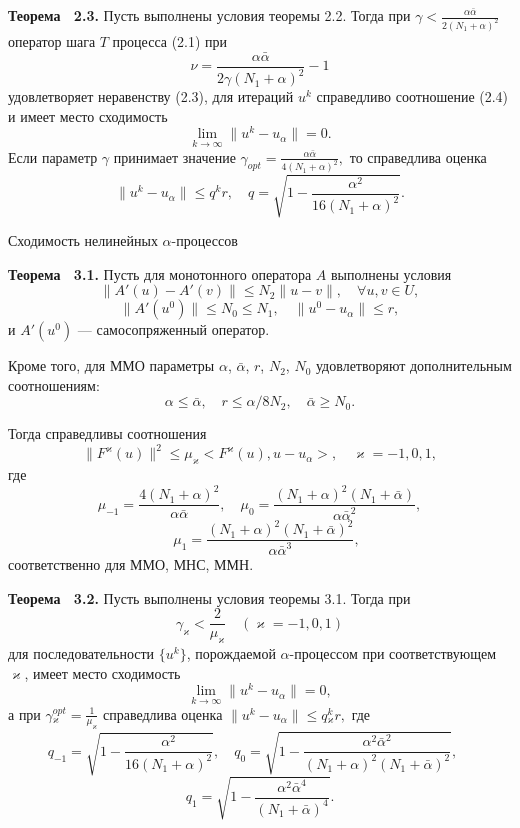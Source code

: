 \documentclass[10pt,pdf, mathserif, hyperref={unicode}]{beamer}
\begin{document}
\begin{frame}
	\begin{block}{\bf Теорема ~2.3.}
		Пусть выполнены условия теоремы 2.2. Тогда при
		$\gamma<\frac{\alpha\bar\alpha}{2(N_1+\alpha)^2}$
		оператор шага $T$ процесса (2.1) при
		$$\nu=\frac{\alpha\bar\alpha}{2\gamma(N_1+\alpha)^2}-1$$
		удовлетворяет неравенству (2.3), для итераций $u^k$ справедливо соотношение (2.4) и имеет место сходимость
		$$\lim_{k\to\infty}\|u^k-u_\alpha\|=0.$$
		Если параметр $\gamma$ принимает значение ${\gamma}_{opt}=\frac{\alpha\bar\alpha}{4(N_1+\alpha)^2},$ то справедлива оценка $$\|u^k-u_\alpha\|\le q^k r, \quad q=\sqrt{1-\frac{{\alpha}^2}  {16(N_1+\alpha)^2}}.$$
	\end{block}
\end{frame}

\begin{frame}{Сходимость нелинейных $\alpha$-процессов}
	\begin{block}{\bf Теорема ~3.1.}
		Пусть для монотонного оператора $A$ выполнены условия $$\|A'(u)-A'(v)\|\le N_2\|u-v\|, \quad \forall u, v \in U,	$$$$\|A'(u^0)\| \le N_0\le N_1, \quad \|u^0-u_\alpha\| \le r,$$ и $A'(u^0)$ --- самосопряженный оператор. 
		
		Кроме того, для ММО параметры $\alpha$, $\bar\alpha$, $r$, $N_2$, $N_0$ удовлетворяют дополнительным соотношениям:
		$$\alpha \le \bar\alpha, \quad r\le \alpha/8N_2, \quad \bar\alpha \ge N_0.$$
		
		Тогда справедливы соотношения
		$$\|F^\varkappa(u)\|^2 \le \mu_\varkappa<F^\varkappa(u), u-u_\alpha>, \quad \varkappa=-1,0,1,$$ где
		$$
		\mu _{-1}=\frac{4(N_1+\alpha)^2}{\alpha\bar\alpha}, \quad \mu _0= \frac{(N_1+\alpha)^2(N_1+\bar\alpha)}{\alpha{\bar\alpha}^2}, $$$$\quad \mu_1= \frac{(N_1+\alpha)^2(N_1+\bar\alpha)^2}{\alpha{\bar\alpha}^3},
		$$
		соответственно для ММО, МНС, ММН.
	\end{block}
\end{frame}
\begin{frame}
	\begin{block}{\bf Теорема ~3.2.}
		Пусть выполнены условия теоремы 3.1. Тогда при
		$$\gamma _\varkappa <\frac{2}{\mu _\varkappa}\quad (\varkappa=-1,0,1)$$
		для последовательности $\{u^k\}$, порождаемой $\alpha$-процессом при соответствующем $\varkappa$, имеет место сходимость $$\lim_{k\to\infty}\|u^k-u_\alpha\|=0, $$ а при 
		$\gamma{_\varkappa^{opt}}=\frac{1}{\mu_\varkappa}$
		справедлива оценка $\|u^k-u_\alpha\|\le q{_\varkappa^k}r,$ где
		$$
		q_{-1}=\sqrt{1-\frac{\alpha^2}{16(N_1+\alpha)^2}}, \quad q_0=\sqrt{1-\frac{\alpha^2\bar\alpha^2}{(N_1+\alpha)^2(N_1+\bar\alpha)^2}}, \quad $$$$q_1=\sqrt{1-\frac{\alpha^2\bar\alpha^4}{(N_1+\bar\alpha)^4}}.
		$$
	\end{block}
\end{frame}
\end{document}
